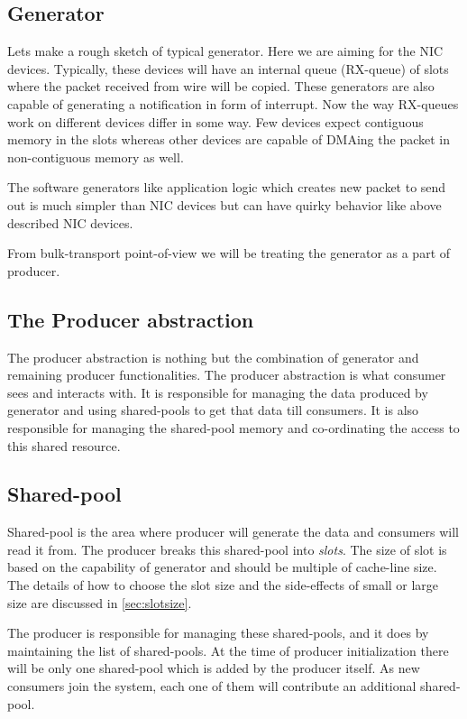 \documentclass[a4paper,twoside]{report} %
\begin{document}
\subsection{Generator}
Lets make a rough sketch of typical generator.  Here we are aiming
for the NIC devices.  Typically, these devices will have an
internal queue (RX-queue) of slots where the packet received
from wire will be copied.  These generators are also capable
of generating a notification in form of interrupt.  Now the
way RX-queues work on different devices differ in some way.
Few devices expect contiguous memory in the slots whereas
other devices are capable of DMAing the packet in non-contiguous
memory as well.

	
The software generators like application
logic which creates new packet to send out is much simpler than
NIC devices but can have quirky behavior like above described
NIC devices.


From bulk-transport point-of-view we will be treating the generator as
a part of producer.

\subsection{The Producer abstraction}
The producer abstraction is nothing but the combination of generator
and remaining producer functionalities.
The producer abstraction is what consumer sees and interacts with.
It is responsible for managing the data produced by generator and
using shared-pools to get that data till consumers.  It is also
responsible for managing the shared-pool memory and co-ordinating 
the access to this shared resource.


\subsection{Shared-pool}
Shared-pool is the area where producer will generate the data
and consumers will read it from. The producer breaks this
shared-pool into \textit{slots}.  The size of slot
is based on the capability of generator and should be multiple of
cache-line size.  The details of how to choose
the slot size and the side-effects of small or large size are
discussed in \autoref{sec:slotsize}.


The producer is responsible for managing these shared-pools, and it
does by maintaining the list of shared-pools.  At the time of producer
initialization there will be only one shared-pool which is added by
the producer itself.  As new consumers join the system, each one of 
them will contribute an additional shared-pool.
\end{document}
